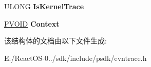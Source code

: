 \begin{DoxyCompactItemize}
\begin{tabbing}
\end{tabbing}\item 
\mbox{\label{struct___e_v_e_n_t___t_r_a_c_e___l_o_g_f_i_l_e_a_a9e6c1ae22820db6e40a26878ccf0848a}} 
U\+L\+O\+NG {\bfseries Is\+Kernel\+Trace}
\item 
\mbox{\label{struct___e_v_e_n_t___t_r_a_c_e___l_o_g_f_i_l_e_a_ababce7f090621458d7533cf7de75d002}} 
\hyperlink{interfacevoid}{P\+V\+O\+ID} {\bfseries Context}
\end{DoxyCompactItemize}


该结构体的文档由以下文件生成\+:\begin{DoxyCompactItemize}
\item 
E\+:/\+React\+O\+S-\/0../sdk/include/psdk/evntrace.\+h\end{DoxyCompactItemize}
